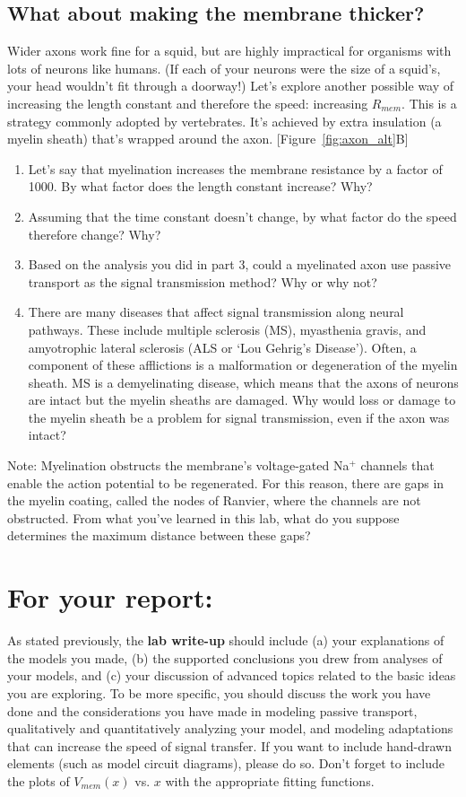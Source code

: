 \subsection*{What about making the membrane thicker?}
Wider axons work fine for a squid, but are highly impractical for organisms with lots of neurons like humans.
(If each of your neurons were the size of a squid's, your head wouldn't fit through a doorway!)
Let's explore another possible way of increasing the length constant and therefore the speed: increasing $R_{mem}$.
This is a strategy commonly adopted by vertebrates.
It's achieved by extra insulation (a myelin sheath) that's wrapped around the axon. [Figure~\ref{fig:axon_alt}B]
\begin{enumerate}
\itemsep-0.2em
\item Let's say that myelination increases the membrane resistance by a factor of 1000. By what factor does the length constant increase? Why?
\item Assuming that the time constant doesn't change, by what factor do the speed therefore change? Why?
\item Based on the analysis you did in part 3, could a myelinated axon use passive transport as the signal transmission method? Why or why not?
\item There are many diseases that affect signal transmission along neural pathways. These include multiple sclerosis (MS), myasthenia gravis, and amyotrophic lateral sclerosis (ALS or `Lou Gehrig's Disease'). Often, a component of these afflictions is a malformation or degeneration of the myelin sheath. MS is a demyelinating disease, which means that the axons of neurons are intact but the myelin sheaths are damaged. Why would loss or damage to the myelin sheath be a problem for signal transmission, even if the axon was intact?
\end{enumerate}
Note: Myelination obstructs the membrane's voltage-gated Na$^{+}$ channels that enable the action potential to be regenerated.
For this reason, there are gaps in the myelin coating, called the nodes of Ranvier, where the channels are not obstructed.
From what you've learned in this lab, what do you suppose determines the maximum distance between these gaps?

\section*{For your report:}
As stated previously, the \textbf{lab write-up} should include (a) your explanations of the models you made, (b) the supported conclusions you drew from analyses of your models, and (c) your discussion of advanced topics related to the basic ideas you are exploring.
To be more specific, you should discuss the work you have done and the considerations you have made in modeling passive transport, qualitatively and quantitatively analyzing your model, and modeling adaptations that can increase the speed of signal transfer.
If you want to include hand-drawn elements (such as model circuit diagrams), please do so.
Don't forget to include the plots of $V_{mem}(x)$ vs. $x$ with the appropriate fitting functions. 